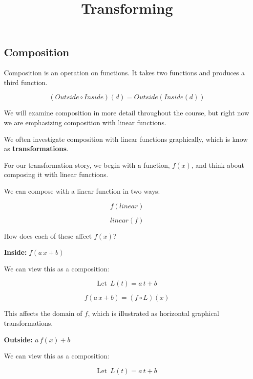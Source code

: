 \documentclass{ximera}
\title{Transforming}
\begin{document}
\begin{abstract}
\end{abstract}
\maketitle





\subsection*{Composition}


Composition is an operation on functions.  It takes two functions and produces a third function.


\[  (Outside \circ Inside)(d) = Outside(Inside(d))    \]


We will examine composition in more detail throughout the course, but right now we are emphasizing composition with linear functions.


We often investigate composition with linear functions graphically, which is know as \textbf{transformations}.



For our transformation story, we begin with a function, $f(x)$, and think about composing it with linear functions.


We can compose with a linear function in two ways:



\[
f(linear)
\] 


\[
linear(f)
\]


How does each of these affect $f(x)$?


\textbf{\textcolor{blue!55!black}{Inside:}} $f(a \, x + b)$  


We can view this as a composition:


\[  \text{Let } \, L(t) = a \, t + b   \]


\[   f(a \, x + b)  = (f \circ L)(x)\]



This affects the domain of $f$, which is illustrated as horizontal graphical transformations.





\textbf{\textcolor{blue!55!black}{Outside:}} $a \, f(x) + b$  


We can view this as a composition:


\[  \text{Let } \, L(t) = a \, t + b   \]
\end{document}

